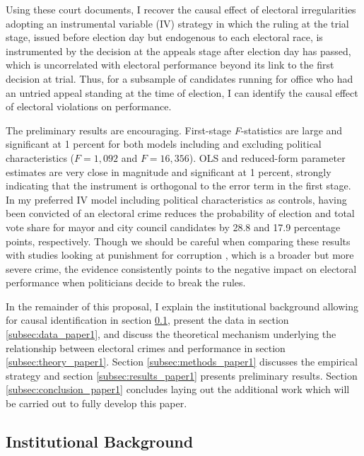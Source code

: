 \documentclass[11pt]{article}
\begin{document}
Using these court documents, I recover the causal effect of electoral irregularities adopting an instrumental variable (IV) strategy in which the ruling at the trial stage, issued before election day but endogenous to each electoral race, is instrumented by the decision at the appeals stage after election day has passed, which is uncorrelated with electoral performance beyond its link to the first decision at trial. Thus, for a subsample of candidates running for office who had an untried appeal standing at the time of election, I can identify the causal effect of electoral violations on performance.

The preliminary results are encouraging. First-stage \emph{F}-statistics are large and significant at 1 percent for both models including and excluding political characteristics ($F = 1{,}092$ and $F = 16{,}356$). OLS and reduced-form parameter estimates are very close in magnitude and significant at 1 percent, strongly indicating that the instrument is orthogonal to the error term in the first stage. In my preferred IV model including political characteristics as controls, having been convicted of an electoral crime reduces the probability of election and total vote share for mayor and city council candidates by 28.8 and 17.9 percentage points, respectively. Though we should be careful when comparing these results with studies looking at punishment for corruption \citep{FerrazExposingCorruptPoliticians2008b,FerrazElectoralAccountabilityCorruption2011a,WintersLackingInformationCondoning2013}, which is a broader but more severe crime, the evidence consistently points to the negative impact on electoral performance when politicians decide to break the rules.

In the remainder of this proposal, I explain the institutional background allowing for causal identification in section \ref{subsec:background_paper1}, present the data in section \ref{subsec:data_paper1}, and discuss the theoretical mechanism underlying the relationship between electoral crimes and performance in section \ref{subsec:theory_paper1}. Section \ref{subsec:methods_paper1} discusses the empirical strategy and section \ref{subsec:results_paper1} presents preliminary results. Section \ref{subsec:conclusion_paper1} concludes laying out the additional work which will be carried out to fully develop this paper.

\clearpage

\subsection{Institutional Background} \label{subsec:background_paper1}
\end{document}
